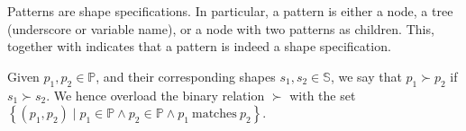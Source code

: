 \begin{corollary} Patterns are shape specifications. In particular, a pattern
is either a node, a tree (underscore or variable name), or a node with two
patterns as children. This, together with  indicates
that a pattern is indeed a shape specification.\end{corollary}

\begin{definition} Given $p_1,p_2\in\mathbb{P}$, and their corresponding shapes
$s_1,s_2\in\mathbb{S}$, we say that $p_1\succ p_2$ if $s_1\succ s_2$. We hence
overload the binary relation $\succ$ with the set $\left\{(p_1,p_2)\mid
p_1\in\mathbb{P} \wedge p_2\in\mathbb{P} \wedge p_1\ \text{matches}\
p_2\right\}$.\end{definition}
